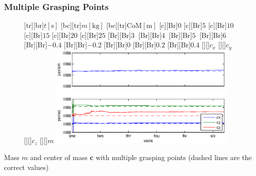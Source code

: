 \documentclass[student,noshadow]{ITRslides}
\renewcommand{\vec}[1]{\boldsymbol{#1}}
\renewcommand{\vec}[1]{\boldsymbol{#1}}
\begin{document}
\begin{frame}
	\frametitle{Multiple Grasping Points}
	\begin{center}
		\begin{figure}
			\centering	
			[tr][br]{$t\left[\mathrm{s}\right]$}
			[bc][tr]{$m\left[\mathrm{kg}\right]$}
			[bc][tr]{$\mathrm{CoM}\left[\mathrm{m}\right]$}
			[c][Br]{$0$}
			[c][Br]{$5$}
			[c][Br]{$10$}
			[c][Br]{$15$}
			[c][Br]{$20$}
			[c][Br]{$25$}
			[Br][Br]{$3\  $}
			[Br][Br]{$4\ $}
			[Br][Br]{$5\  $}
			[Br][Br]{$6\  $}
			[Br][Br]{$-0.4$}
			[Br][Br]{$-0.2$}
			[Br][Br]{$0$}
			[Br][Br]{$0.2$}
			[Br][Br]{$0.4$}
			[][]{\tiny $c_x$}
			[][]{\tiny $c_y$}
			[][]{\tiny $c_z$}
			[][]{\tiny $m$}
			\includegraphics[width=0.8\textwidth]{fig/multiple_grasping_points_human_mass_and_cog.eps}
		\end{figure}
		\vspace{0.2cm}
		Mass $m$ and center of mass $\vec{c}$ with multiple grasping points (dashed lines are the correct values)
	\end{center}
\end{frame}
\end{document}
